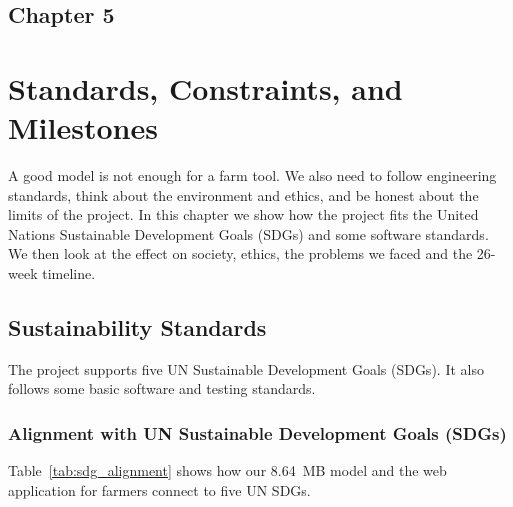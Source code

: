 \begin{center}
    \section*{\fontsize{20}{20}\selectfont Chapter 5}
\end{center}
\vspace{10mm}

\section{Standards, Constraints, and Milestones}

A good model is not enough for a farm tool. We also need to follow engineering standards, think about the environment and ethics, and be honest about the limits of the project. In this chapter we show how the project fits the United Nations Sustainable Development Goals (SDGs) and some software standards. We then look at the effect on society, ethics, the problems we faced and the 26-week timeline.

\subsection{Sustainability Standards}
The project supports five UN Sustainable Development Goals (SDGs). It also follows some basic software and testing standards.

\subsubsection*{Alignment with UN Sustainable Development Goals (SDGs)}
Table~\ref{tab:sdg_alignment} shows how our 8.64~MB model and the web application for farmers connect to five UN SDGs.

